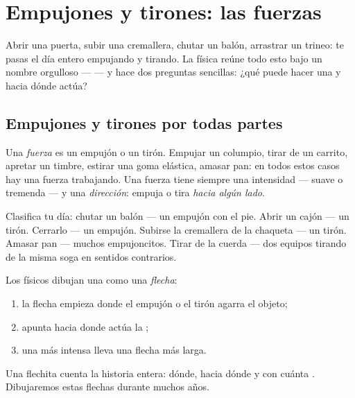 \chapter{Empujones y tirones: las fuerzas}\label{ch:g2:pushes-and-pulls}

Abrir una puerta, subir una cremallera, chutar un balón, arrastrar un
trineo: te pasas el día entero empujando y tirando. La física reúne
todo esto bajo un nombre orgulloso ---  --- y hace dos preguntas
sencillas: ¿qué puede hacer una  y hacia dónde actúa?

\section{Empujones y tirones por todas partes}

\begin{definition}[La fuerza]\label{def:g2:pushes-and-pulls:force}
Una \emph{fuerza} es un empujón o un tirón. Empujar un
columpio, tirar de un carrito, apretar un timbre, estirar una goma
elástica, amasar pan: en todos estos casos hay una fuerza trabajando.
Una fuerza tiene siempre una intensidad --- suave o tremenda --- y una
\emph{dirección}: empuja o tira \emph{hacia algún lado}.
\end{definition}

\begin{example}\label{ex:g2:pushes-and-pulls:sort}
Clasifica tu día: chutar un balón --- un empujón con el pie. Abrir un
cajón --- un tirón. Cerrarlo --- un empujón. Subirse la cremallera de
la chaqueta --- un tirón. Amasar pan --- muchos empujoncitos. Tirar de la
cuerda --- dos equipos tirando de la misma soga en sentidos
contrarios.
\end{example}

\begin{method}\label{met:g2:pushes-and-pulls:arrow}
Los físicos dibujan una  como una \emph{flecha}:
\begin{enumerate}
  \item la flecha empieza donde el empujón o el tirón agarra el
        objeto;
  \item apunta hacia donde actúa la ;
  \item una  más intensa lleva una flecha más larga.
\end{enumerate}
Una flechita cuenta la historia entera: dónde, hacia dónde y con
cuánta . Dibujaremos estas flechas durante muchos años.
\end{method}

